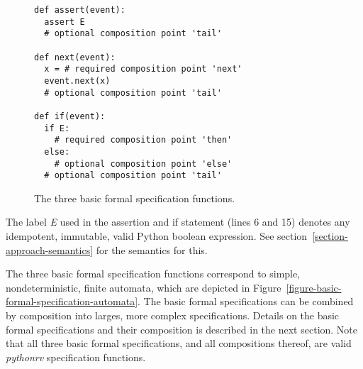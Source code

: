 \documentclass[a4paper,11pt]{kth-mag}
\begin{document}
\begin{figure}[h!]
	\begin{center}
	\begin{minipage}{0.7\textwidth}
	\begin{lstlisting}
def assert(event):
  assert E
  # optional composition point 'tail'

def next(event):
  x = # required composition point 'next'
  event.next(x)
  # optional composition point 'tail'

def if(event):
  if E:
    # required composition point 'then'
  else:
    # optional composition point 'else'
  # optional composition point 'tail'
	\end{lstlisting}
	\end{minipage}
	\end{center}

	\caption{The three basic formal specification functions.}
	\label{figure-basic-formal-specification-functions}
\end{figure}

The label \textit{E} used in the assertion and if statement (lines 6 and 15)
denotes any idempotent, immutable, valid Python boolean expression. See
section~\ref{section-approach-semantics} for the semantics for this.

The three basic formal specification functions correspond to simple,
nondeterministic, finite automata, which are depicted in
Figure~\ref{figure-basic-formal-specification-automata}. The basic formal
specifications can be combined by composition into larges, more complex
specifications. Details on the basic formal specifications and their
composition is described in the next section. Note that all three
basic formal specifications, and all compositions thereof, are valid
\textit{pythonrv} specification functions.
\end{document}
